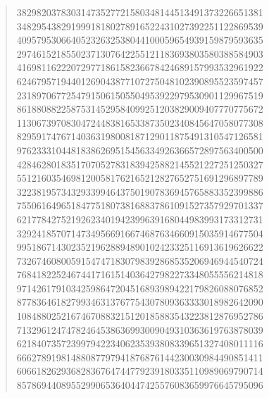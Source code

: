 \documentclass[oneside,12pt]{book}   	%
\theoremstyle{definition}
\begin{document}
\begin{spacing}{1.618}
\begin{quote}
38298203783031473527721580348144513491373226651381 \\
34829543829199918180278916522431027392251122869539 \\
40957953066405232632538044100059654939159879593635 \\
29746152185502371307642255121183693803580388584903 \\
41698116222072977186158236678424689157993532961922 \\
62467957194401269043877107275048102390895523597457 \\
23189706772547915061505504953922979530901129967519 \\
86188088225875314529584099251203829009407770775672 \\
11306739708304724483816533873502340845647058077308 \\
82959174767140363198008187129011875491310547126581 \\
97623331044818386269515456334926366572897563400500 \\
42846280183517070527831839425882145521227251250327 \\
55121603546981200581762165212827652751691296897789 \\
32238195734329339946437501907836945765883352399886 \\
75506164965184775180738168837861091527357929701337 \\
62177842752192623401942399639168044983993173312731 \\
32924185707147349566916674687634660915035914677504 \\
99518671430235219628894890102423325116913619626622 \\
73267460800591547471830798392868535206946944540724 \\
76841822524674417161514036427982273348055556214818 \\
97142617910342598647204516893989422179826088076852 \\
87783646182799346313767754307809363333018982642090 \\
10848802521674670883215120185883543223812876952786 \\
71329612474782464538636993009049310363619763878039 \\
62184073572399794223406235393808339651327408011116 \\
66627891981488087797941876876144230030984490851411 \\
60661826293682836764744779239180335110989069790714 \\
85786944089552990653640447425576083659976645795096 \\

\end{quote}
\end{spacing}
\end{document}
